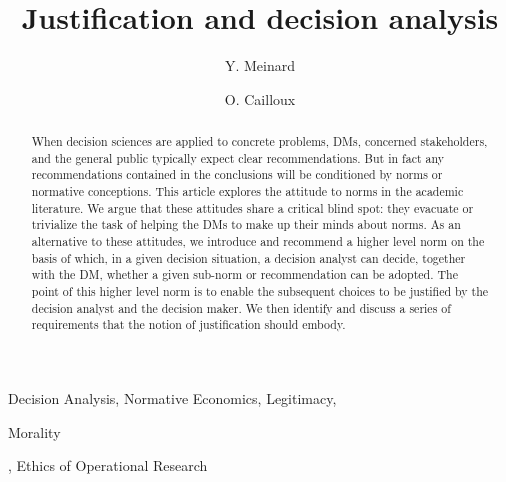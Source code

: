 \documentclass[preprint, french, english, 11pt, authoryear]{elsarticle}%
\begin{document}
\hypersetup{citecolor=black}
\title{Justification and decision analysis}

\author[ld]{Y. Meinard}
\author[ld]{O. Cailloux}
\address[ld]{Universit\'e Paris-Dauphine, PSL Research University, CNRS, UMR [7243], LAMSADE, 75016 PARIS, FRANCE}

\begin{abstract}
\begin{changebar}When decision sciences are applied to concrete problems, \acp{DM}, concerned stakeholders, and the general public typically expect clear recommendations.
But in fact any recommendations contained in the conclusions will be conditioned by norms or normative conceptions.
This article explores the attitude to norms in the academic literature. We argue that these attitudes share a critical blind spot: they evacuate or trivialize the task of helping the \acp{DM} to make up their minds about norms.
As an alternative to these attitudes, we introduce and recommend a higher level norm on the basis of which, in a given decision situation, a decision analyst can decide, together with the \ac{DM}, whether a given sub-norm or recommendation can be adopted.
The point of this higher level norm is to enable the subsequent choices to be justified by the decision analyst and the decision maker. We then identify and discuss a series of requirements that the notion of justification should embody.\end{changebar}

\end{abstract}
\acresetall
\begin{keyword}
Decision Analysis, Normative Economics, Legitimacy, \begin{changebar}Morality\end{changebar}, Ethics of Operational Research
\end{keyword}
\end{document}
